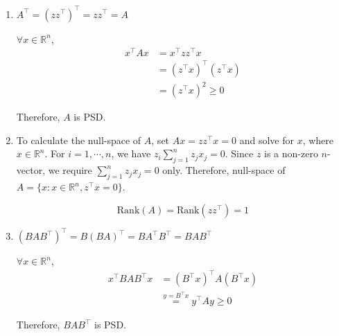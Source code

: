 \item 
\begin{enumerate}
    \item \begin{answer}
        $A^{\top} = (zz^{\top})^{\top} = zz^{\top} = A$
        
        $\forall x \in \mathbb{R}^n$,
        \begin{align*}
            x^{\top}Ax &= x^{\top}zz^{\top}x \\
            &= (z^{\top}x)^{\top} (z^{\top}x) \\
            &= (z^{\top}x)^2 \ge 0
        \end{align*}

        Therefore, $A$ is PSD.
    \end{answer}

    \item \begin{answer}
        To calculate the null-space of $A$, set $Ax = zz^{\top}x = 0$ and solve for $x$, where $x \in \mathbb{R}^n$.
        For $i=1, \cdots, n$, we have $z_i \sum_{j=1}^n z_j x_j = 0$. Since $z$ is a non-zero $n$-vector, we require $\sum_{j=1}^n z_j x_j = 0$ only.
        Therefore, null-space of $A = \{x: x \in \mathbb{R}^n, z^{\top}x = 0 \}$.

        $$\text{Rank}(A) = \text{Rank}(zz^{\top}) = 1$$
    \end{answer}

    \item \begin{answer}
        $(BAB^{\top})^{\top} = B(BA)^{\top} = BA^{\top}B^{\top} = BAB^{\top}$

        $\forall x \in \mathbb{R}^n$,
        \begin{align*}
            x^{\top}BAB^{\top}x &= (B^{\top}x)^{\top}A(B^{\top}x) \\
            &\overset{y=B^{\top}x}{=} y^{\top}Ay \ge 0
        \end{align*}

        Therefore, $BAB^{\top}$ is PSD.
    \end{answer}
\end{enumerate}